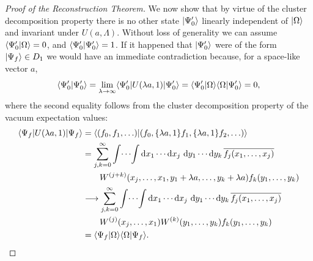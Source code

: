 \begin{proof}[Proof of the Reconstruction Theorem]
We now show that by virtue of the cluster decomposition property there is no
other state \(\lvert \Psi'_0\rangle\) linearly independent of \(\lvert \Omega\rangle\) and
invariant under \(U(a,\Lambda)\).  Without loss of generality we can assume
\(\langle \Psi'_0\vert \Omega\rangle=0\), and \(\langle \Psi'_0\vert \Psi'_0\rangle=1\).  If it
happened that \(\lvert \Psi'_0\rangle\) were of the form \(\lvert \Psi_f\rangle\in D_1\) we
would have an immediate contradiction because, for a space-like vector \(a\),
\begin{equation*}
\langle \Psi'_0\vert \Psi'_0\rangle
 =\lim_{\lambda\to\infty}
 \langle \Psi'_0\rvert U(\lambda a,1)\lvert \Psi'_0\rangle
 =\langle \Psi'_0\vert \Omega\rangle\langle \Omega\vert \Psi'_0\rangle=0 ,
\end{equation*}
where the second equality follows from the cluster decomposition property of
the vacuum expectation values:
\begin{equation*}
\begin{aligned}
\bra{\Psi_f}U(\lambda a,1)\ket{\Psi_f}
 &=\braket{(f_0,f_1,\ldots)}{(f_0,\{\lambda a,1\}f_1,
       \{\lambda a,1\}f_2,\ldots)}\\
 &=\sum_{j,k=0}^{\infty}\int\!\cdots\!\int
 \dd x_1\cdots\dd x_j\,\dd y_1\cdots\dd y_k\,
 \overline{f_j(x_1,\ldots,x_j)}\\
 &\qquad \Wightman^{(j+k)}(x_j,\ldots,x_1,
 y_1+\lambda a,\ldots,y_k+\lambda a)
 f_k(y_1,\ldots,y_k)\\
 &\longrightarrow\sum_{j,k=0}^{\infty}\int\!\cdots\!\int
 \dd x_1\cdots\dd x_j\,\dd y_1\cdots\dd y_k\,
 \overline{f_j(x_1,\ldots,x_j)}\\
 &\qquad \Wightman^{(j)}(x_j,\ldots,x_1)
 \Wightman^{(k)}(y_1,\ldots,y_k)f_k(y_1,\ldots,y_k)\\
 &=\braket{\Psi_f}{\Omega}\braket{\Omega}{\Psi_f} .
\end{aligned}
\end{equation*}


\end{proof}
